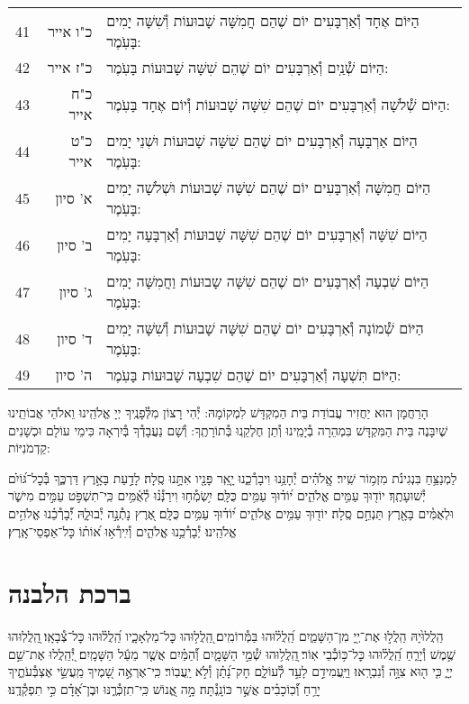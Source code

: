 \documentclass[twoside, openany, parskip=half, 11pt]{book}
\begin{document}
\begin{scriptsize}
\begin{longtable}{ l | r | p{} }
41 & כ"ו אייר & הַיּוֹם אֶחָד וְ֯אַרְבָּעִים יוֹם שֶׁהֵם חֲמִשָּׁה שָׁבוּעוֹת וְ֯שִׁשָּׁה יָמִים בָּעֹֽמֶר: \\
42 & כ"ז אייר & הַיּוֹם שְׁ֯נַֽיִם וְ֯אַרְבָּעִים יוֹם שֶׁהֵם שִׁשָּׁה שָׁבוּעוֹת בָּעֹֽמֶר: \\
43 & כ"ח אייר & הַיּוֹם שְׁ֯לֹשָׁה וְ֯אַרְבָּעִים יוֹם שֶׁהֵם שִׁשָּׁה שָׁבוּעוֹת וְ֯יוֹם אֶחָד בָּעֹֽמֶר: \\
44 & כ"ט אייר & הַיּוֹם אַרְבָּעָה וְ֯אַרְבָּעִים יוֹם שֶׁהֵם שִׁשָּׁה שָׁבוּעוֹת וּשְׁנֵי יָמִים בָּעֹֽמֶר: \\
45 & א' סיון & הַיּוֹם חֲמִשָּׁה וְ֯אַרְבָּעִים יוֹם שֶׁהֵם שִׁשָּׁה שָׁבוּעוֹת וּשְׁלֹשָׁה יָמִים בָּעֹֽמֶר: \\
46 & ב' סיון & הַיּוֹם שִׁשָּׁה וְ֯אַרְבָּעִים יוֹם שֶׁהֵם שִׁשָּׁה שָׁבוּעוֹת וְ֯אַרְבָּעָה יָמִים בָּעֹֽמֶר: \\
47 & ג' סיון & הַיּוֹם שִׁבְעָה וְ֯אַרְבָּעִים יוֹם שֶׁהֵם שִׁשָּׁה שָבוּעוֹת וַחֲמִשָּׁה יָמִים בָּעֹֽמֶר: \\
48 & ד' סיון & הַיּוֹם שְׁ֯מוֹנָה וְ֯אַרְבָּעִים יוֹם שֶׁהֵם שִׁשָּׁה שָׁבוּעוֹת וְ֯שִׁשָּׁה יָמִים בָּעֹֽמֶר: \\
49 & ה' סיון & הַיּוֹם תִּשְׁעָה וְ֯אַרְבָּעִים יוֹם שֶׁהֵם שִׁבְעָה שָׁבוּעוֹת בָּעֹֽמֶר:
\end{longtable}
\end{scriptsize}



הָרַחֲמָן הוּא יַחֲזִיר עֲבוֹדַת בֵּית הַמִקְדָּשׁ לִמְקוֹמָהּ:
יְ֯הִי רָצוֹן מִלְּ֯פָנֶֽיךָ יְיָ אֱלֹהֵֽינוּ וֵאלֹהֵי אֲבוֹתֵֽינוּ שֶׁיִבָּנֶה בֵּית הַמִּקְדָּשׁ בִּמְהֵרָה בְ֯יָמֵֽינוּ וְ֯תֵן חֶלְקֵֽנוּ בְּ֯תוֹרָתֶֽךָ: וְ֯שָׁם נַעֲבָדְ֯ךָ בְּ֯יִרְאָה כִּימֵי עוֹלָם וּכְשָׁנִים קַדְמֹנִיּוֹת:


לַמְנַצֵּ֥חַ בִּנְגִינֹ֗ת מִזְמ֥וֹר שִֽׁיר׃ אֱֽלֹהִ֗ים יְ֯חָנֵּ֥נוּ וִיבָרְ֯כֵ֑נוּ יָ֤אֵֽר פָּנָ֖יו אִתָּ֣נוּ סֶֽלָה׃ לָדַ֣עַת בָּאָ֣רֶץ דַּרְכֶּ֑ךָ בְּ֯כׇל־גּ֝וֹיִ֗ם יְ֯שׁוּעָתֶֽךָ׃ יוֹד֖וּךָ עַמִּ֥ים אֱלֹהִ֑ים י֝וֹד֗וּךָ עַמִּ֥ים כֻּלָּֽם׃ יִ֥שְׂמְ֯ח֥וּ וִירַנְּ֯נ֗וּ לְ֯אֻ֫מִּ֥ים כִּֽי־תִשְׁפֹּ֣ט עַמִּ֣ים מִישֹׁ֑ר וּלְאֻמִּ֓ים בָּאָ֖רֶץ תַּנְחֵ֣ם סֶֽלָה׃ יוֹד֖וּךָ עַמִּ֥ים אֱלֹהִ֑ים י֝וֹד֗וּךָ עַמִּ֥ים כֻּלָּֽם׃ אֶ֭רֶץ נָתְ֯נָ֣ה יְ֯בוּלָ֑הּ יְ֯֝בָרְ֯כֵ֗נוּ אֱלֹהִ֥ים
אֱלֹהֵֽינוּ׃ יְ֯בָרְ֯כֵ֥נוּ אֱלֹהִ֑ים וְ֯יִֽירְ֯א֥וּ א֝וֹת֗וֹ כָּל־אַפְסֵי־אָֽרֶץ׃

\section[ברכת הלבנה]{ ברכת הלבנה }

הַֽלֲלוּ֙יָהּ הַֽלֲל֣וּ אֶת־יְ֖יָ מִן־הַשָּׁמַ֑יִם הַֽ֝לֲל֗וּהוּ בַּמְּ֯רוֹמִֽים׃
֭הַֽלֲל֥וּהוּ כׇּל־מַלְאָכָ֑יו הַֽ֝לֲל֗וּהוּ כׇּל־צְ֯בָאָֽו׃
֖הַֽלֲלֽוּהוּ שֶׁ֣מֶשׁ וְ֯יָרֵ֑חַ הַֽ֝לֲל֗וּהוּ כׇּל־כּ֥וֹכְ֯בֵי אֽוֹר׃
֖הַֽלֲל֥וּהוּ שְׁ֯מֵ֣י הַשָּׁמָ֑יִם וְ֝֯הַמַּ֗יִם אֲשֶׁ֤ר מֵעַ֬ל הַשָּׁמָֽיִם׃
יְ֭֯הַֽלֲלוּ אֶת־שֵׁ֣ם יְיָ֑ כִּ֤י ה֖וּא צִוָּ֣ה וְ֯נִבְרָֽאוּ׃
וַיַּֽעֲמִידֵ֣ם לָעַ֣ד לְ֯עוֹלָ֑ם חָק־נָ֝תַ֗ן וְ֯לֹ֣א יַֽעֲבֽוֹר׃
כִּֽי־אֶרְאֶ֣ה שָׁ֭מֶיךָ מַֽעֲשֵׂ֣י אֶצְבְּ֯עֹתֶ֑יךָ יָרֵ֥חַ וְ֝֯כֽוֹכָבִ֗ים אֲשֶׁ֣ר כּוֹנָֽנְ֯תָּה׃
מָ֣ה אֱ֭נוֹשׁ כִּֽי־תִזְכְּ֯רֶ֑נּוּ וּבֶן־אָ֝דָ֗ם כִּ֣י תִפְקְ֯דֶֽנּוּ׃
\end{document}
